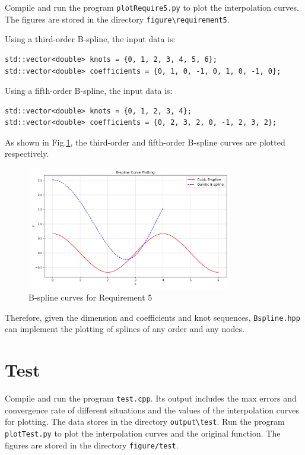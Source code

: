 \documentclass[a4paper]{article}
\begin{document}
\begin{sloppypar}
Compile and run the program \verb|plotRequire5.py| to plot the interpolation
curves. The figures are stored in the directory \verb|figure\requirement5|.

Using a third-order B-spline, the input data is:
\begin{verbatim}
std::vector<double> knots = {0, 1, 2, 3, 4, 5, 6};
std::vector<double> coefficients = {0, 1, 0, -1, 0, 1, 0, -1, 0};
\end{verbatim}

Using a fifth-order B-spline, the input data is:
\begin{verbatim}
std::vector<double> knots = {0, 1, 2, 3, 4};
std::vector<double> coefficients = {0, 2, 3, 2, 0, -1, 2, 3, 2};
\end{verbatim}

As shown in Fig.\ref{fig:require5_bspline_curves}, the third-order and
fifth-order B-spline curves are plotted respectively.

\begin{figure}[H]
  \centering
  \includegraphics[width=0.8\textwidth]{../figure/requirement5/bspline_curves.png}
  \renewcommand{\figurename}{Fig.}
  \caption{B-spline curves for Requirement 5}
  \label{fig:require5_bspline_curves}
\end{figure}

Therefore, given the dimension and coefficients and knot sequences,
\verb|Bspline.hpp| can implement the plotting of splines of any order and any
nodes.

\section*{Test}
Compile and run the program \verb|test.cpp|. Its output includes the max errors and convergence rate of different situations and the values of the interpolation curves for plotting. The data stores in the directory \verb|output\test|.
Run the program \verb|plotTest.py| to plot the interpolation curves and the original function. The figures are stored in the directory \verb|figure/test|.


\end{sloppypar}
\end{document}
